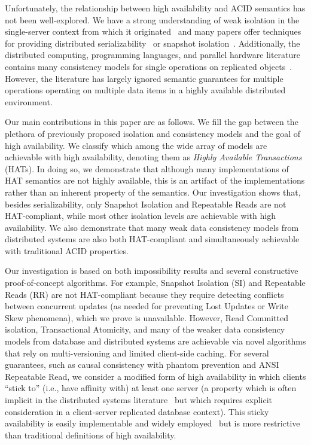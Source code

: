 Unfortunately, the relationship between high availability and ACID
semantics has not been well-explored. We have a strong understanding
of weak isolation in the single-server context from which it
originated~\cite{adya, ansicritique, gray-isolation} and many papers
offer techniques for providing distributed
serializability~\cite{bernstein-book, spanner, daudjee-session,
  hstore, krikellas-bargain, calvin, kemme-classification} or snapshot
isolation~\cite{daudjee-snapshot,generalizedsnapshot, kemme-snapshot,
  walter}. Additionally, the distributed computing, programming
languages, and parallel hardware literature contains many
consistency models for single operations on replicated objects~\cite{
  ceri-mechanism, chen-mechanism, pnuts, herlihy-art, eiger, cac,
  sessionguarantees}. However, the literature has largely ignored
semantic guarantees for multiple operations operating on multiple data
items in a highly available distributed environment.

Our main contributions in this paper are as follows. We fill the gap
between the plethora of previously proposed isolation and consistency
models and the goal of high availability.  We classify which among the
wide array of models are achievable with high availability, denoting
them as {\em Highly Available Transactions} (HATs). In doing so, we
demonstrate that although many implementations of HAT semantics are
not highly available, this is an artifact of the implementations
rather than an inherent property of the semantics. Our investigation
shows that, besides serializability, only Snapshot Isolation and
Repeatable Reads are not HAT-compliant, while most other isolation
levels are achievable with high availability. We also demonstrate that
many weak data consistency models from distributed systems are also
both HAT-compliant and simultaneously achievable with traditional ACID
properties.

Our investigation is based on both impossibility results and several
constructive proof-of-concept algorithms. For example, Snapshot
Isolation (SI) and Repeatable Reads (RR) are not HAT-compliant because
they require detecting conflicts between concurrent updates (as needed
for preventing Lost Updates or Write Skew phenomena), which we prove
is unavailable. However, Read Committed isolation, Transactional
Atomicity, and many of the weaker data consistency models from
database and distributed systems are achievable via novel algorithms
that rely on multi-versioning and limited client-side caching. For
several guarantees, such as causal consistency with phantom prevention
and ANSI Repeatable Read, we consider a modified form of high
availability in which clients ``stick to'' (i.e., have affinity with)
at least one server (a property which is often implicit in the
distributed systems literature~\cite{herlihy-art, eiger, cac} but
which requires explicit consideration in a client-server replicated
database context). This sticky availability is easily implementable
and widely employed~\cite{eiger, vogels-defs} but is more restrictive
than traditional definitions of high availability.

